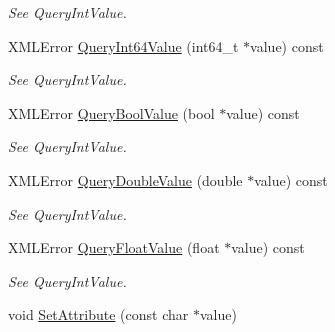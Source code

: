 \begin{DoxyCompactItemize}
\begin{DoxyCompactList}\small\item\em See Query\+Int\+Value. \end{DoxyCompactList}\item 
X\+M\+L\+Error \hyperlink{classtinyxml2_1_1XMLAttribute_a553d419c598e79b2858f65c8a2ba598c}{Query\+Int64\+Value} (int64\+\_\+t $\ast$value) const \hypertarget{classtinyxml2_1_1XMLAttribute_a553d419c598e79b2858f65c8a2ba598c}{}\label{classtinyxml2_1_1XMLAttribute_a553d419c598e79b2858f65c8a2ba598c}

\begin{DoxyCompactList}\small\item\em See Query\+Int\+Value. \end{DoxyCompactList}\item 
X\+M\+L\+Error \hyperlink{classtinyxml2_1_1XMLAttribute_a9e9b94369f182df72aaac9acd04afead}{Query\+Bool\+Value} (bool $\ast$value) const \hypertarget{classtinyxml2_1_1XMLAttribute_a9e9b94369f182df72aaac9acd04afead}{}\label{classtinyxml2_1_1XMLAttribute_a9e9b94369f182df72aaac9acd04afead}

\begin{DoxyCompactList}\small\item\em See Query\+Int\+Value. \end{DoxyCompactList}\item 
X\+M\+L\+Error \hyperlink{classtinyxml2_1_1XMLAttribute_a0872c05edea2a7cde4bd96c1e9cb2fc4}{Query\+Double\+Value} (double $\ast$value) const \hypertarget{classtinyxml2_1_1XMLAttribute_a0872c05edea2a7cde4bd96c1e9cb2fc4}{}\label{classtinyxml2_1_1XMLAttribute_a0872c05edea2a7cde4bd96c1e9cb2fc4}

\begin{DoxyCompactList}\small\item\em See Query\+Int\+Value. \end{DoxyCompactList}\item 
X\+M\+L\+Error \hyperlink{classtinyxml2_1_1XMLAttribute_afb254627c296d1d70b755397d32fece8}{Query\+Float\+Value} (float $\ast$value) const \hypertarget{classtinyxml2_1_1XMLAttribute_afb254627c296d1d70b755397d32fece8}{}\label{classtinyxml2_1_1XMLAttribute_afb254627c296d1d70b755397d32fece8}

\begin{DoxyCompactList}\small\item\em See Query\+Int\+Value. \end{DoxyCompactList}\item 
void \hyperlink{classtinyxml2_1_1XMLAttribute_a406d2c4a13c7af99a65edb59dd9f7581}{Set\+Attribute} (const char $\ast$value)\hypertarget{classtinyxml2_1_1XMLAttribute_a406d2c4a13c7af99a65edb59dd9f7581}{}\label{classtinyxml2_1_1XMLAttribute_a406d2c4a13c7af99a65edb59dd9f7581}


\end{DoxyCompactItemize}
